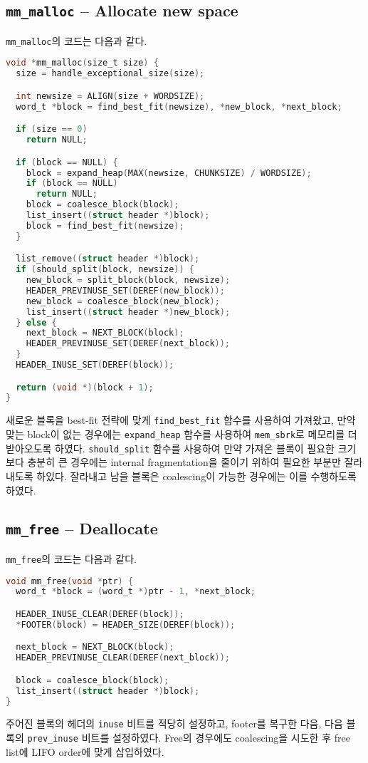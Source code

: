 \documentclass{scrartcl}
\begin{document}
\subsection{\texttt{mm\_malloc} -- Allocate new space}
\texttt{mm\_malloc}의 코드는 다음과 같다.
\begin{lstlisting}[language=C]
void *mm_malloc(size_t size) {
  size = handle_exceptional_size(size);

  int newsize = ALIGN(size + WORDSIZE);
  word_t *block = find_best_fit(newsize), *new_block, *next_block;

  if (size == 0)
    return NULL;

  if (block == NULL) {
    block = expand_heap(MAX(newsize, CHUNKSIZE) / WORDSIZE);
    if (block == NULL)
      return NULL;
    block = coalesce_block(block);
    list_insert((struct header *)block);
    block = find_best_fit(newsize);
  }

  list_remove((struct header *)block);
  if (should_split(block, newsize)) {
    new_block = split_block(block, newsize);
    HEADER_PREVINUSE_SET(DEREF(new_block));
    new_block = coalesce_block(new_block);
    list_insert((struct header *)new_block);
  } else {
    next_block = NEXT_BLOCK(block);
    HEADER_PREVINUSE_SET(DEREF(next_block));
  }
  HEADER_INUSE_SET(DEREF(block));

  return (void *)(block + 1);
}
\end{lstlisting}
새로운 블록을 best-fit 전략에 맞게 \texttt{find\_best\_fit} 함수를 사용하여
가져왔고, 만약 맞는 block이 없는 경우에는 \texttt{expand\_heap} 함수를 사용하여
\texttt{mem\_sbrk}로 메모리를 더 받아오도록 하였다. \texttt{should\_split}
함수를 사용하여 만약 가져온 블록이 필요한 크기보다 충분히 큰 경우에는 internal
fragmentation을 줄이기 위하여 필요한 부분만 잘라내도록 하있다. 잘라내고 남을
블록은 coalescing이 가능한 경우에는 이를 수행하도록 하였다.

\subsection{\texttt{mm\_free} -- Deallocate}
\texttt{mm\_free}의 코드는 다음과 같다.
\begin{lstlisting}[language=C]
void mm_free(void *ptr) {
  word_t *block = (word_t *)ptr - 1, *next_block;

  HEADER_INUSE_CLEAR(DEREF(block));
  *FOOTER(block) = HEADER_SIZE(DEREF(block));

  next_block = NEXT_BLOCK(block);
  HEADER_PREVINUSE_CLEAR(DEREF(next_block));

  block = coalesce_block(block);
  list_insert((struct header *)block);
}
\end{lstlisting}
주어진 블록의 헤더의 \texttt{inuse} 비트를 적당히 설정하고, footer를 복구한
다음, 다음 블록의 \texttt{prev\_inuse} 비트를 설정하였다. Free의 경우에도
coalescing을 시도한 후 free list에 LIFO order에 맞게 삽입하였다.
\end{document}
